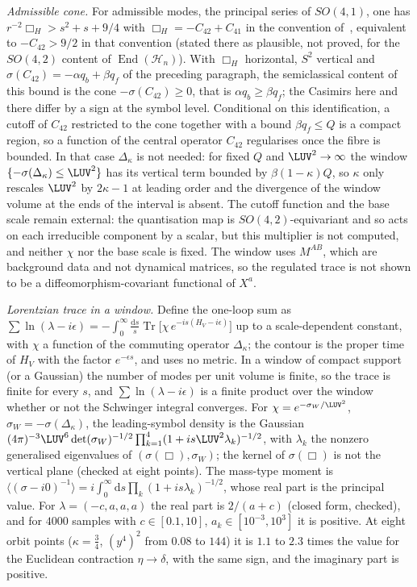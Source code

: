 \emph{Admissible cone.} For admissible modes, the principal series of \(SO(4,1)\), one has \(r^{-2}\Box_H>s^2+s+9/4\) with \(\Box_H=-C_{42}+C_{41}\) in the convention of~\cite{Steinacker2019NoGhost}, equivalent to \(-C_{42}>9/2\) in that convention (stated there as plausible, not proved, for the \(SO(4,2)\) content of \(\operatorname{End}(\mathcal H_n)\)). With \(\Box_H\) horizontal, \(S^2\) vertical and \(\sigma(C_{42})=-\alpha q_b+\beta q_f\) of the preceding paragraph, the semiclassical content of this bound is the cone \(-\sigma(C_{42})\ge0\), that is \(\alpha q_b\ge\beta q_f\); the Casimirs here and there differ by a sign at the symbol level. Conditional on this identification, a cutoff of \(C_{42}\) restricted to the cone together with a bound \(\beta q_f\le Q\) is a compact region, so a function of the central operator \(C_{42}\) regularises once the fibre is bounded. In that case \(\Delta_\kappa\) is not needed: for fixed \(Q\) and \(\LUV^2\to\infty\) the window \(\{-\sigma(\Delta_\kappa)\le\LUV^2\}\) has its vertical term bounded by \(\beta(1-\kappa)Q\), so \(\kappa\) only rescales \(\LUV^2\) by \(2\kappa-1\) at leading order and the divergence of the window volume at the ends of the interval is absent. The cutoff function and the base scale remain external: the quantisation map is \(SO(4,2)\)-equivariant and so acts on each irreducible component by a scalar, but this multiplier is not computed, and neither \(\chi\) nor the base scale is fixed. The window uses \(M^{AB}\), which are background data and not dynamical matrices, so the regulated trace is not shown to be a diffeomorphism-covariant functional of \(X^a\).

\emph{Lorentzian trace in a window.} Define the one-loop sum as \(\sum\ln(\lambda-i\epsilon)=-\int_0^\infty\frac{\mathrm ds}{s}\operatorname{Tr}\bigl[\chi\,e^{-is(H_V-i\epsilon)}\bigr]\) up to a scale-dependent constant, with \(\chi\) a function of the commuting operator \(\Delta_\kappa\); the contour is the proper time of \(H_V\) with the factor \(e^{-\epsilon s}\), and uses no metric. In a window of compact support (or a Gaussian) the number of modes per unit volume is finite, so the trace is finite for every \(s\), and \(\sum\ln(\lambda-i\epsilon)\) is a finite product over the window whether or not the Schwinger integral converges. For \(\chi=e^{-\sigma_W/\LUV^2}\), \(\sigma_W=-\sigma(\Delta_\kappa)\), the leading-symbol density is the Gaussian \((4\pi)^{-3}\LUV^6\det(\sigma_W)^{-1/2}\prod_{k=1}^{4}(1+is\LUV^2\lambda_k)^{-1/2}\), with \(\lambda_k\) the nonzero generalised eigenvalues of \((\sigma(\Box),\sigma_W)\); the kernel of \(\sigma(\Box)\) is not the vertical plane (checked at eight points). The mass-type moment is \(\langle(\sigma-i0)^{-1}\rangle=i\int_0^\infty\mathrm ds\prod_k(1+is\lambda_k)^{-1/2}\), whose real part is the principal value. For \(\lambda=(-c,a,a,a)\) the real part is \(2/(a+c)\) (closed form, checked), and for \(4000\) samples with \(c\in[0.1,10]\), \(a_k\in[10^{-3},10^{3}]\) it is positive. At eight orbit points (\(\kappa=\tfrac34\), \((y^4)^2\) from \(0.08\) to \(144\)) it is \(1.1\) to \(2.3\) times the value for the Euclidean contraction \(\eta\to\delta\), with the same sign, and the imaginary part is positive.

